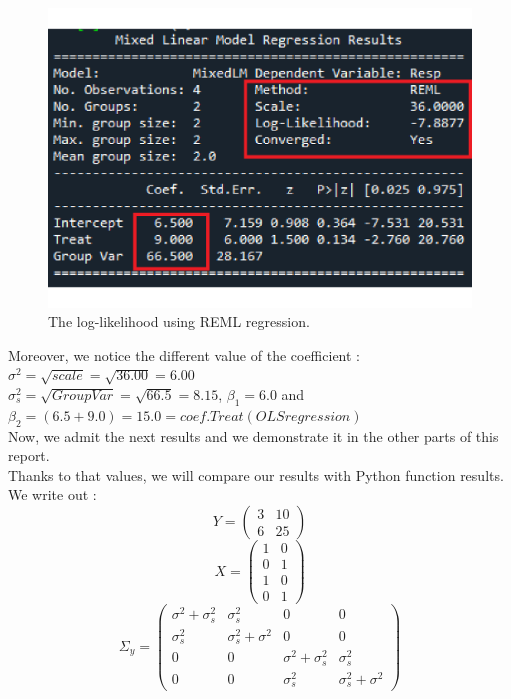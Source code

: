 \documentclass{article}
\begin{document}
\begin{figure}[H]
    \begin{center}
        \includegraphics[scale=0.3]{./images/REML_regression.pdf}
        \caption{The log-likelihood using REML regression.}
    \end{center}
\end{figure}
Moreover, we notice the different value of the coefficient : $\sigma^2 =\sqrt{scale}= \sqrt{36.00}= 6.00$\\
$\sigma_s^2 = \sqrt{Group Var}=\sqrt{66.5} = 8.15$, $\beta_1 = 6.0$ and $\beta_2 = (6.5+9.0) = 15.0 = coef.Treat(OLS regression)$\\
Now, we admit the next results and we demonstrate it in the other parts of this report.\\
Thanks to that values, we will compare our results with Python function results.\\
We write out :
\[Y = \begin{pmatrix} 3 & 10 \\ 6 & 25 \end{pmatrix}\]
\[X = \begin{pmatrix} 1 & 0 \\ 0 & 1 \\ 1 & 0 \\ 0 & 1 \end{pmatrix}\]
\[ \Sigma_y = \begin{pmatrix} \sigma^2+\sigma_s^2 & \sigma_s^2 & 0 & 0 \\ \sigma_s^2 & \sigma_s^2+\sigma^2 & 0 & 0 \\ 0 & 0 & \sigma^2+\sigma_s^2 & \sigma_s^2 \\ 0 & 0 & \sigma_s^2 & \sigma_s^2+\sigma^2 \end{pmatrix}\]
\end{document}
